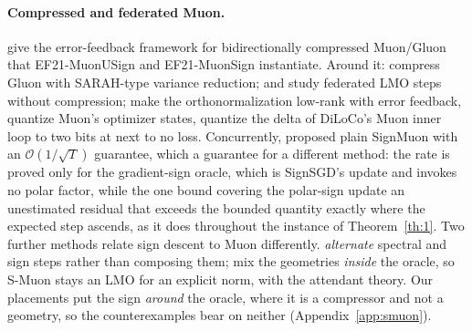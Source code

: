 \paragraph{Compressed and federated Muon.} \citet{gruntkowska2025error} give the error-feedback framework for bidirectionally compressed Muon/Gluon that EF21-MuonUSign and EF21-MuonSign instantiate. Around it: \citet{qian2026communicationefficientgluon} compress Gluon with SARAH-type variance reduction; \citet{takezawa2025fedmuonfederatedlearningbiascorrected} and \citet{zhang2025fedmuon} study federated LMO steps without compression; \citet{ahn2025dion} make the orthonormalization low-rank with error feedback, \citet{gupta2025effective} quantize Muon's optimizer states, \citet{therien2025muloco} quantize the delta of DiLoCo's Muon inner loop \citep{douillard2024diloco} to two bits at next to no loss. Concurrently, \citet{mishra2026signmuon} proposed plain SignMuon with an $\mathcal{O}(1/\sqrt{T})$ guarantee, which  a guarantee for a different method: the rate is proved only for the gradient-sign oracle, which is SignSGD's update and invokes no polar factor, while the one bound covering the polar-sign update  an unestimated residual that exceeds the bounded quantity exactly where the expected step ascends, as it does throughout the instance of Theorem~\ref{th:1}. Two further methods relate sign descent to Muon differently. \citet{bolatov2026lionmuon} \emph{alternate} spectral and sign steps rather than composing them; \citet{kravatskiy2025kyfannorms} mix the geometries \emph{inside} the oracle, so S-Muon stays an LMO for an explicit norm, with the attendant theory. Our placements put the sign \emph{around} the oracle, where it is a compressor and not a geometry, so the counterexamples bear on neither (Appendix~\ref{app:smuon}).

\section{}\label{app:opt:signa}

